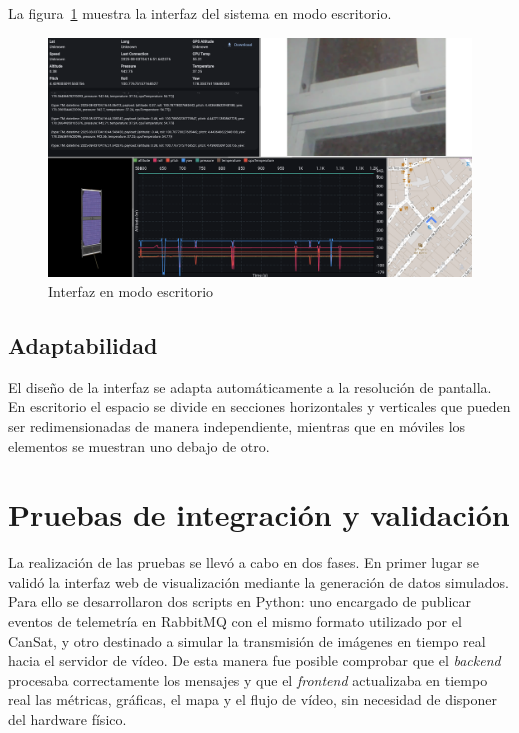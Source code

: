 La figura~\ref{fig:interfaz_general} muestra la interfaz del sistema en modo escritorio.
\begin{figure}[H]
    \centering
    \includegraphics[width=1\textwidth]{Imagenes/Bitmap/initerfaz_general}
    \caption{Interfaz en modo escritorio}
    \label{fig:interfaz_general}
\end{figure}

\subsection{Adaptabilidad}

El diseño de la interfaz se adapta automáticamente a la resolución de pantalla.
En escritorio el espacio se divide en secciones horizontales y verticales que pueden ser redimensionadas de manera independiente, mientras que en móviles los elementos se muestran uno debajo de otro.


\section{Pruebas de integración y validación}

La realización de las pruebas se llevó a cabo en dos fases. En primer lugar se validó la interfaz web de visualización mediante la generación de datos simulados. Para ello se desarrollaron dos scripts en Python: uno encargado de publicar eventos de telemetría en RabbitMQ con el mismo formato utilizado por el CanSat, y otro destinado a simular la transmisión de imágenes en tiempo real hacia el servidor de vídeo. De esta manera fue posible comprobar que el \emph{backend} procesaba correctamente los mensajes y que el \emph{frontend} actualizaba en tiempo real las métricas, gráficas, el mapa y el flujo de vídeo, sin necesidad de disponer del hardware físico. 

